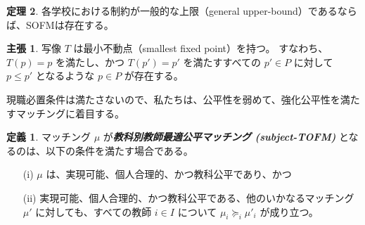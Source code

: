 \documentclass[12pt, a4paper]{article}
\theoremstyle{definition}
\newtheorem{defn}{定義}
\theoremstyle{remark}
\theoremstyle{plain}
\begin{document}






\textbf{定理 2}. 
各学校における制約が一般的な上限（general upper-bound）であるならば、SOFMは存在する。


\textbf{主張 1}. 
写像 $T$ は最小不動点（smallest fixed point）を持つ。
すなわち、$T(p) = p$ を満たし、かつ $T(p') = p'$ を満たすすべての $p' \in P$ に対して $p \leq p'$ となるような $p \in P$ が存在する。


\bigbreak

現職必置条件は満たさないので、私たちは、公平性を弱めて、強化公平性を満たすマッチングに着目する。


\begin{defn}
マッチング $\mu$ が\textbf{\textit{教科別教師最適公平マッチング (subject-TOFM)}} となるのは、以下の条件を満たす場合である。
\begin{itemize}
    \item[(i)] $\mu$ は、実現可能、個人合理的、かつ教科公平であり、かつ
    \item[(ii)] 実現可能、個人合理的、かつ教科公平である、他のいかなるマッチング $\mu'$ に対しても、すべての教師 $i \in I$ について $\mu_i \succeq_i \mu'_i$ が成り立つ。
\end{itemize}
\end{defn}


\end{document}
